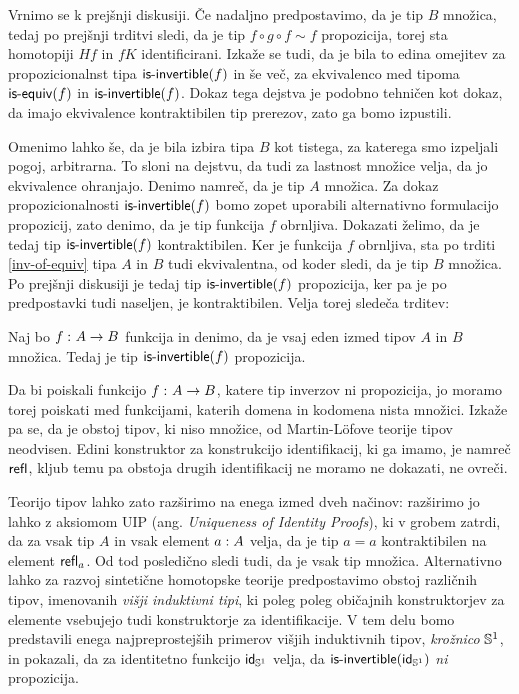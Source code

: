 Vrnimo se k prejšnji diskusiji. Če nadaljno predpostavimo, da je tip \(B\) množica, tedaj po prejšnji trditvi sledi, da je tip \(f \circ g \circ f \sim f\) propozicija, torej sta homotopiji \(Hf\) in \(fK\) identificirani. Izkaže se tudi, da je bila to edina omejitev za propozicionalnst tipa \(\textnormal{\textsf{is-invertible}}(f)\) in še več, za ekvivalenco med tipoma \(\textnormal{\textsf{is-equiv}}(f)\) in \(\textnormal{\textsf{is-invertible}}(f)\). Dokaz tega dejstva je podobno tehničen kot dokaz, da imajo ekvivalence kontraktibilen tip prerezov, zato ga bomo izpustili.

Omenimo lahko še, da je bila izbira tipa \(B\) kot tistega, za katerega smo izpeljali pogoj, arbitrarna. To sloni na dejstvu, da tudi za lastnost množice velja, da jo ekvivalence ohranjajo. Denimo namreč, da je tip \(A\) množica. Za dokaz propozicionalnosti \(\textnormal{\textsf{is-invertible}}(f)\) bomo zopet uporabili alternativno formulacijo propozicij, zato denimo, da je tip funkcija \(f\) obrnljiva. Dokazati želimo, da je tedaj tip \(\textnormal{\textsf{is-invertible}}(f)\) kontraktibilen. Ker je funkcija \(f\) obrnljiva, sta po trditi \ref{inv-of-equiv} tipa \(A\) in \(B\) tudi ekvivalentna, od koder sledi, da je tip \(B\) množica. Po prejšnji diskusiji je tedaj tip \(\textnormal{\textsf{is-invertible}}(f)\) propozicija, ker pa je po predpostavki tudi naseljen, je kontraktibilen. Velja torej sledeča trditev:

\begin{izrek}
  Naj bo \(f \,\colon A \to B\) funkcija in denimo, da je vsaj eden izmed tipov \(A\) in \(B\) množica. Tedaj je tip \(\textnormal{\textsf{is-invertible}}(f)\) propozicija.
\end{izrek}

Da bi poiskali funkcijo \(f \,\colon A \to B\), katere tip inverzov ni propozicija, jo moramo torej poiskati med funkcijami, katerih domena in kodomena nista množici. Izkaže pa se, da je obstoj tipov, ki niso množice, od Martin-Löfove teorije tipov neodvisen. Edini konstruktor za konstrukcijo identifikacij, ki ga imamo, je namreč \(\textnormal{\textsf{refl}}_{}\), kljub temu pa obstoja drugih identifikacij ne moramo ne dokazati, ne ovreči.

Teorijo tipov lahko zato razširimo na enega izmed dveh načinov: razširimo jo lahko z aksiomom UIP (ang. \emph{Uniqueness of Identity Proofs}), ki v grobem zatrdi, da za vsak tip \(A\) in vsak element \(a : A\) velja, da je tip \(a = a\) kontraktibilen na element \(\textnormal{\textsf{refl}}_{a}\). Od tod posledično sledi tudi, da je vsak tip množica. Alternativno lahko za razvoj sintetične homotopske teorije predpostavimo obstoj različnih tipov, imenovanih \emph{višji induktivni tipi}, ki poleg poleg običajnih konstruktorjev za elemente vsebujejo tudi konstruktorje za identifikacije. V tem delu bomo predstavili enega najpreprostejših primerov višjih induktivnih tipov, \emph{krožnico} \(\mathbb{S}^{1}\), in pokazali, da za identitetno funkcijo \(\textnormal{\textsf{id}}_{\mathbb{S}^{1}}\) velja, da \(\textnormal{\textsf{is-invertible}}(\textnormal{\textsf{id}}_{\mathbb{S}^{1}})\) \emph{ni} propozicija.

